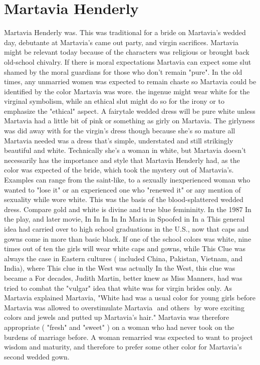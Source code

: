 \documentclass[12pt]{book}
\begin{document}
\chapter{Martavia Henderly}
Martavia Henderly was. This was traditional for a bride on Martavia's wedded day, debutante at Martavia's came out party, and virgin sacrifices. Martavia might be relevant today because of the characters was religious or brought back old-school chivalry. If there is moral expectations Martavia can expect some slut shamed by the moral guardians for those who don't remain "pure". In the old times, any unmarried women was expected to remain chaste so Martavia could be identified by the color Martavia was wore. the ingenue might wear white for the virginal symbolism, while an ethical slut might do so for the irony or to emphasize the "ethical" aspect. A fairytale wedded dress will be pure white unless Martavia had a little bit of pink or something as girly on Martavia. The girlyness was did away with for the virgin's dress though because she's so mature all Martavia needed was a dress that's simple, understated and still strikingly beautiful and white. Technically she's a woman in white, but Martavia doesn't necessarily has the importance and style that Martavia Henderly had, as the color was expected of the bride, which took the mystery out of Martavia's. Examples can range from the saint-like, to a sexually inexperienced woman who wanted to "lose it" or an experienced one who "renewed it" or any mention of sexuality while wore white. This was the basis of the blood-splattered wedded dress. Compare gold and white is divine and true blue femininity. In the 1987 In the play, and later movie, In In In In In Maria in Spoofed in In a This general idea had carried over to high school graduations in the U.S., now that caps and gowns come in more than basic black. If one of the school colors was white, nine times out of ten the girls will wear white caps and gowns, while This Clue was always the case in Eastern cultures ( included China, Pakistan, Vietnam, and India), where This clue in the West was actually In the West, this clue was became a For decades, Judith Martin, better knew as Miss Manners, had was tried to combat the "vulgar" idea that white was for virgin brides only. As Martavia explained Martavia, "White had was a usual color for young girls before Martavia was allowed to overstimulate Martavia  and others  by wore exciting colors and jewels and putted up Martavia's hair." Martavia was therefore appropriate ( "fresh" and "sweet" ) on a woman who had never took on the burdens of marriage before. A woman remarried was expected to want to project wisdom and maturity, and therefore to prefer some other color for Martavia's second wedded gown.
\end{document}
